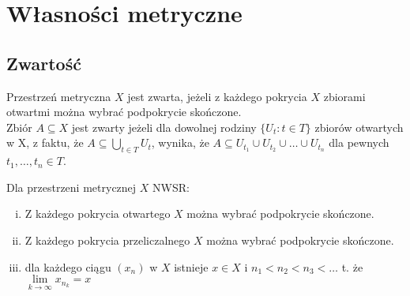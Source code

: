 \section{Własności metryczne}
\subsection{Zwartość}
\begin{df} Przestrzeń metryczna $X$ jest zwarta, jeżeli z każdego pokrycia $X$ zbiorami otwartmi można wybrać podpokrycie skończone. \\
    Zbiór $A \subseteq X$ jest zwarty jeżeli dla dowolnej rodziny $\{U_t : t \in T\}$ zbiorów otwartych w X, z faktu, że $A \subseteq \bigcup\limits_{t \in T} U_t$,
    wynika, że $A \subseteq U_{t_1} \cup U_{t_2} \cup \ldots \cup U_{t_n}$ dla pewnych $t_1,\ldots,t_n \in T$. \end{df}
\begin{tw} Dla przestrzeni metrycznej $X$ NWSR:
    \begin{enumerate}[(i)]
        \item Z każdego pokrycia otwartego $X$ można wybrać podpokrycie skończone.
        \item Z każdego pokrycia przeliczalnego $X$ można wybrać podpokrycie skończone. 
        \item dla każdego ciągu $(x_n)$ w $X$ istnieje $x \in X$ i $n_1 < n_2 < n_3 < \ldots$ t. że $\lim\limits_{k \rightarrow \infty} x_{n_k} = x$
    \end{enumerate} 
\end{tw}
